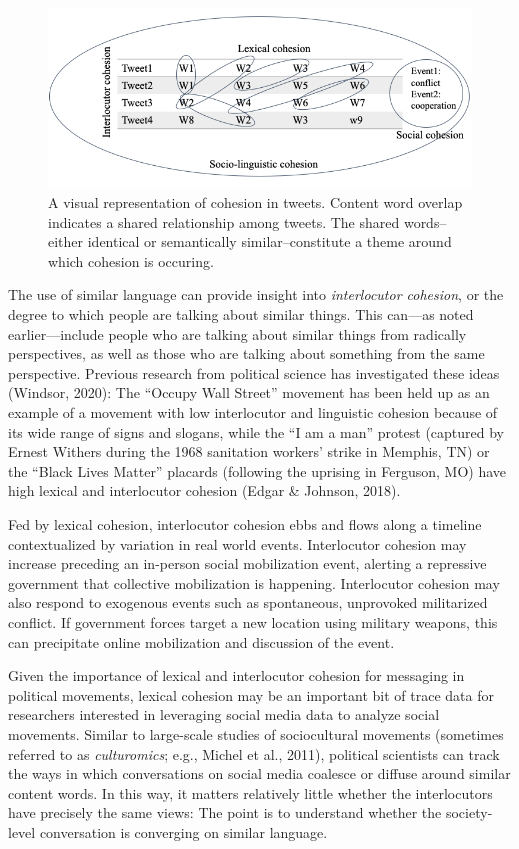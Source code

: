 \documentclass[
  english,
  man]{apa6}
\begin{document}
\begin{figure}
\includegraphics[width=1\linewidth]{./figs/cohesion-in-tweets} \caption{A visual representation of cohesion in tweets. Content word overlap indicates a shared relationship among tweets. The shared words--either identical or semantically similar--constitute a theme around which cohesion is occuring.}\label{fig:cohesion-in-tweets}
\end{figure}

The use of similar language can provide insight into \emph{interlocutor cohesion}, or
the degree to which people are talking about similar things. This can---as noted
earlier---include people who are talking about similar things from radically
perspectives, as well as those who are talking about something from the same
perspective. Previous research from political science has investigated these
ideas (Windsor, 2020): The \enquote{Occupy Wall Street} movement has been held up as an
example of a movement with low interlocutor and linguistic cohesion because of
its wide range of signs and slogans, while the \enquote{I am a man} protest (captured by
Ernest Withers during the 1968 sanitation workers' strike in Memphis, TN) or the
\enquote{Black Lives Matter} placards (following the uprising in Ferguson, MO) have high
lexical and interlocutor cohesion (Edgar \& Johnson, 2018).

Fed by lexical cohesion, interlocutor cohesion ebbs and flows along a timeline
contextualized by variation in real world events. Interlocutor cohesion may
increase preceding an in-person social mobilization event, alerting a repressive
government that collective mobilization is happening. Interlocutor cohesion may
also respond to exogenous events such as spontaneous, unprovoked militarized
conflict. If government forces target a new location using military weapons,
this can precipitate online mobilization and discussion of the event.

Given the importance of lexical and interlocutor cohesion for messaging in
political movements, lexical cohesion may be an important bit of trace data for
researchers interested in leveraging social media data to analyze social
movements. Similar to large-scale studies of sociocultural movements (sometimes
referred to as \emph{culturomics}; e.g., Michel et al., 2011), political
scientists can track the ways in which conversations on social media coalesce or
diffuse around similar content words. In this way, it matters relatively little
whether the interlocutors have precisely the same views: The point is to
understand whether the society-level conversation is converging on similar
language.
\end{document}
